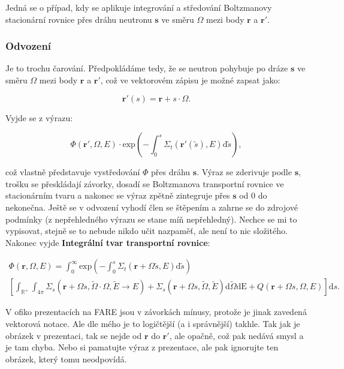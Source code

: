 Jedná se o případ, kdy se aplikuje integrování a středování Boltzmanovy stacionární rovnice přes dráhu neutronu $\textbf{s}$ ve směru $\Omega$ mezi body $\textbf{r}$ a $\textbf{r}'$. 

\subsubsection{Odvození}

Je to trochu čarování. Předpokládáme tedy, že se neutron pohybuje po dráze $\textbf{s}$ ve směru $\Omega$ mezi body $\textbf{r}$ a $\textbf{r}'$, což ve vektorovém zápisu je možné zapsat jako:

$$\textbf{r}'(s) = \textbf{r} + s \cdot \Omega. $$
  
Vyjde se z výrazu:

$$\Phi(\textbf{r}', \Omega, E) \cdot \text{exp} \left ( -\int_0^s \Sigma_t(\textbf{r}'(\tilde{s}), E) \text{d} \tilde{s} \right ),$$
  
což vlastně představuje vystředování $\Phi$ přes dráhu $\textbf{s}$. Výraz se zderivuje podle $\textbf{s}$, trošku se přeskládají závorky, dosadí se Boltzmanova transportní rovnice ve stacionárním tvaru a nakonec se výraz zpětně zintegruje přes $\textbf{s}$ od 0 do nekonečna. Ještě se v odvození vyhodí člen se štěpením a zahrne se do zdrojové podmínky (z nepřehledného výrazu se stane míň nepřehledný). Nechce se mi to vypisovat, stejně se to nebude nikdo učit nazpaměť, ale není to nic složitého. Nakonec vyjde \textbf{Integrální tvar transportní rovnice}:

\begin{equation}
  \boxed{
  \begin{multlined}
    \Phi(\textbf{r}, \Omega, E) = \int_0^\infty \text{exp} \left ( -\int_0^s \Sigma_t(\textbf{r} + \Omega \tilde{s}, E) \text{d} \tilde{s} \right ) \\
    \left [ \int_\mathbb{R^+} \int_{4 \pi}  \Sigma_s(\textbf{r} + \Omega s, \tilde{\Omega} \cdot \Omega, \tilde{E} \rightarrow E) + \Sigma_s(\textbf{r} + \Omega s, \tilde{\Omega}, \tilde{E}) \text{d}\tilde{\Omega} \text{d}\text{E} + Q(\textbf{r} + \Omega s, \Omega, E) \right ] \text{d}s.
  \end{multlined}}
  \label{integralni_transportka}
\end{equation}

V ofiko prezentacích na FARE jsou v závorkách mínusy, protože je jinak zavedená vektorová notace. Ale dle mého je to logičtější (a i správnější) takhle. Tak jak je obrázek v prezentaci, tak se nejde od $\textbf{r}$ do $\textbf{r}'$, ale opačně, což pak nedává smysl a je tam chyba. Nebo si pamatujte výraz z prezentace, ale pak ignorujte ten obrázek, který tomu neodpovídá.

